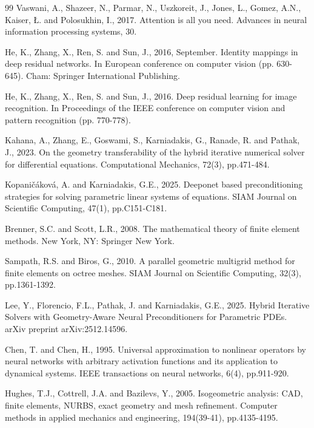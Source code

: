 \documentclass{article}
\theoremstyle{plain}
\numberwithin{equation}{section}
\begin{document}
\begin{thebibliography}{99}
    Vaswani, A., Shazeer, N., Parmar, N., Uszkoreit, J., Jones, L., Gomez, A.N., Kaiser, Ł. and Polosukhin, I., 2017. Attention is all you need. Advances in neural information processing systems, 30.

    He, K., Zhang, X., Ren, S. and Sun, J., 2016, September. Identity mappings in deep residual networks. In European conference on computer vision (pp. 630-645). Cham: Springer International Publishing.

    He, K., Zhang, X., Ren, S. and Sun, J., 2016. Deep residual learning for image recognition. In Proceedings of the IEEE conference on computer vision and pattern recognition (pp. 770-778).

    Kahana, A., Zhang, E., Goswami, S., Karniadakis, G., Ranade, R. and Pathak, J., 2023. On the geometry transferability of the hybrid iterative numerical solver for differential equations. Computational Mechanics, 72(3), pp.471-484.

    Kopaničáková, A. and Karniadakis, G.E., 2025. Deeponet based preconditioning strategies for solving parametric linear systems of equations. SIAM Journal on Scientific Computing, 47(1), pp.C151-C181.

    Brenner, S.C. and Scott, L.R., 2008. The mathematical theory of finite element methods. New York, NY: Springer New York.

    Sampath, R.S. and Biros, G., 2010. A parallel geometric multigrid method for finite elements on octree meshes. SIAM Journal on Scientific Computing, 32(3), pp.1361-1392.

    Lee, Y., Florencio, F.L., Pathak, J. and Karniadakis, G.E., 2025. Hybrid Iterative Solvers with Geometry-Aware Neural Preconditioners for Parametric PDEs. arXiv preprint arXiv:2512.14596.

    Chen, T. and Chen, H., 1995. Universal approximation to nonlinear operators by neural networks with arbitrary activation functions and its application to dynamical systems. IEEE transactions on neural networks, 6(4), pp.911-920.

    Hughes, T.J., Cottrell, J.A. and Bazilevs, Y., 2005. Isogeometric analysis: CAD, finite elements, NURBS, exact geometry and mesh refinement. Computer methods in applied mechanics and engineering, 194(39-41), pp.4135-4195.


\end{thebibliography}
\end{document}
